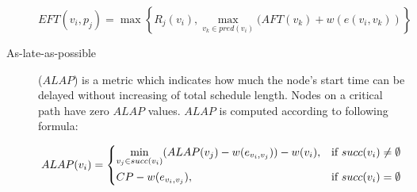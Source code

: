 \begin{description}
\[
EFT(v_i, p_j) = \max 
\left\{
  R_j(v_i), \max_{v_k \in pred(v_i)}(AFT(v_k) + w(e(v_i, v_k))
\right\}
\]

\item[As-late-as-possible] ($ALAP$) is a metric which indicates how
  much the node's start time can be delayed without increasing of
  total schedule length. Nodes on a critical path have zero $ALAP$
  values. $ALAP$ is computed according to following formula:

\[
ALAP(v_i) = 
\begin{dcases}
   \min_{v_j \in succ(v_i)}(ALAP(v_j) - w(e_{v_i, v_j})) - w(v_i),  &  \text{if } succ(v_i) \neq \emptyset\\
   CP - w(e_{v_i, v_j}), &  \text{if } succ(v_i) = \emptyset
 \end{dcases}
\]

\end{description}
